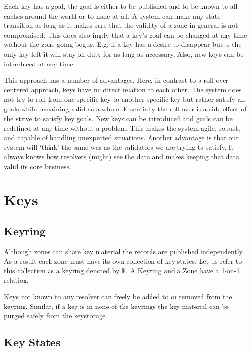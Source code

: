 \documentclass[twoside, a4paper]{article}
\begin{document}
Each key has a goal, the goal is either to be published and to be 
known to all caches around the world or to none at all. A system can 
make any state transition as long as it makes sure that the validity 
of a zone in general is not compromised. This does also imply that a 
key's goal can be changed at any time without the zone going bogus. 
E.g. if a key has a desire to disappear but is the only key left it 
will stay on duty for as long as necessary. Also, new keys can be 
introduced at any time.

This approach has a number of advantages. Here, in contrast to a 
roll-over centered approach, keys have no direct relation to each 
other. The system does not try to roll from one specific key to 
another specific key but rather satisfy all goals while remaining 
valid as a whole. Essentially the roll-over is a side effect of the 
strive to satisfy key goals. New keys can be introduced and goals 
can be redefined at any time without a problem. This makes the 
system agile, robust, and capable of handling unexpected situations. 
Another advantage is that our system will `think' the same was as 
the validators we are trying to satisfy. It always knows how 
resolvers (might) see the data and makes keeping that data valid its 
core business. 


\section{Keys}

\subsection{Keyring}

Although zones can share key material the records are published 
independently. As a result each zone must have its own collection of 
key states. Let us refer to this collection as a keyring denoted by 
$\mathbb{K}$. A Keyring and a Zone have a 1-on-1 relation.

Keys not known to any resolver can freely be added to or removed 
from the keyring. Similar, if a key is in none of the keyrings the 
key material can be purged safely from the keystorage.

\subsection{Key States} \label{sec:keystates}
\end{document}
